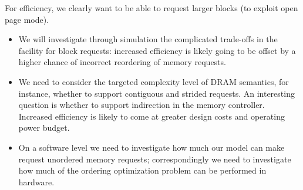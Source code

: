 For efficiency, we clearly want to be able to request larger blocks
(to exploit open page mode).
   
\begin{itemize}
\item We will investigate through simulation the complicated trade-offs in the facility for block requests: increased efficiency is likely going to be offset by a higher chance of incorrect reordering of memory requests.


\begin{comment} %
    How much more benefit can be obtained by sending larger requests, such
    as a group of block accesses?  For example, the processor might tell
    the memory controller that it only needs one contiguous data stream,
    or it might tell the memory controller that it will need seven
    contiguous data streams, with streams 0..5 being consumed at the same
    rate and stream 6 being consumed at 1/2 the rate of the others (e.g.,
    perhaps it is composed of 32-bit array indices rather than 64-bit data
    items).
\end{comment} %
\item We need to consider the targeted complexity level of DRAM
  semantics, for instance, whether to support contiguous and strided
  requests. An interesting question is whether to support indirection
  in the memory controller. Increased efficiency is likely to come at
  greater design costs and operating power budget.
\begin{comment}
    A more complex example might include a combination of
    contiguous and strided references, or a combination of
    contiguous and indirect references.
  \item Do we need the memory controller to be able to perform
    indirection?  One could imagine the memory controller
    prefetching the indirect index vector ahead of the other data
    in order to determine the indirectly accessed data addresses in
    advance.
\end{comment}
\item On a software level we need to investigate how much our model
  can make request unordered memory requests; correspondingly we need
  to investigate how much of the ordering optimization problem can be
  performed in hardware.
\begin{comment}
  \item Does it make sense to assume that we can exploit knowing
    these addresses in advance in order to improve DRAM scheduling

\end{comment}
\end{itemize}
